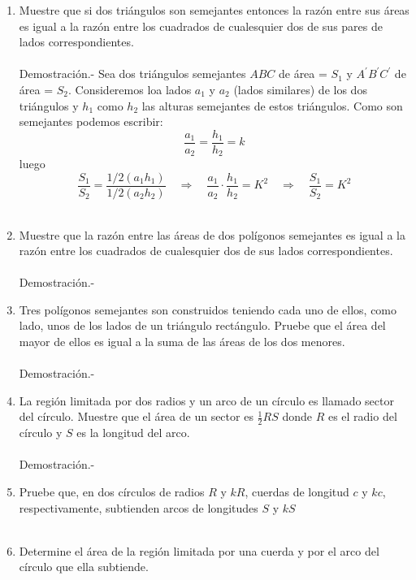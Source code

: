 \documentclass[10pt]{article}
\begin{document}
\begin{enumerate}
\item  Muestre que si dos triángulos son semejantes entonces la razón entre sus áreas es igual a la razón entre los cuadrados de cualesquier dos de sus pares de lados correspondientes.\\\\
    Demostración.-\; Sea dos triángulos semejantes $ABC$ de área = $S_1$ y $A^{'} B^{'} C^{'}$ de área = $S_2$. Consideremos loa lados $a_1$ y $a_2$ (lados similares) de los dos triángulos y $h_1$ como $h_2$ las alturas semejantes de estos triángulos. Como son semejantes podemos escribir: $$\dfrac{a_1}{a_2}=\dfrac{h_1}{h_2}=k$$ luego $$\dfrac{S_1}{S_2}=\dfrac{1/2 (a_1 h_1)}{1/2 (a_2 h_2)} \quad \Longrightarrow \quad \dfrac{a_1}{a_2}\cdot \dfrac{h_1}{h_2}=K^2 \quad \Longrightarrow \quad \dfrac{S_1}{S_2}=K^2$$\\

\item Muestre que la razón entre las áreas de dos polígonos semejantes es igual a la razón entre los cuadrados de cualesquier dos de sus lados correspondientes.\\\\
    Demostración.-\;

\item Tres polígonos semejantes son construidos teniendo cada uno de ellos, como lado, unos de los lados de un triángulo rectángulo. Pruebe que el área del mayor de ellos es igual a la suma de las áreas de los dos menores.\\\\
    Demostración.-\;

\item La región limitada por dos radios y un arco de un círculo es llamado sector del círculo. Muestre que el área de un sector es $\frac{1}{2}RS$ donde $R$ es el radio del círculo y $S$ es la longitud del arco.\\\\
    Demostración.-\;

\item Pruebe que, en dos círculos de radios $R$ y $kR$, cuerdas de longitud $c$ y $kc$, respectivamente, subtienden arcos de longitudes $S$ y $kS$\\\\

\item Determine el área de la región limitada por una cuerda y por el arco del círculo que ella subtiende.\\\\


\end{enumerate}
\end{document}
